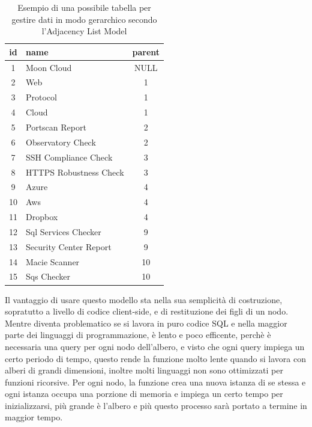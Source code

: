 \begin{table}[ht!]
\centering
\begin{tabular}[c]{| c | l | c |} 
	\hline
	id & name & parent \\ [0.5ex] 
	\hline
	\rowcolor{rootnodecell} 1 & Moon Cloud & NULL \\ [0.5ex] 
	\rowcolor{categorycell} 2 & Web & 1 \\ [0.5ex] 
	\rowcolor{categorycell} 3 & Protocol & 1 \\ [0.5ex] 
	\rowcolor{categorycell} 4 & Cloud & 1 \\ [0.5ex] 
	\rowcolor{evaluationcell} 5 & Portscan Report & 2 \\ [0.5ex] 
	\rowcolor{evaluationcell} 6 & Observatory Check & 2 \\ [0.5ex] 
	\rowcolor{evaluationcell} 7 & SSH Compliance Check & 3 \\ [0.5ex] 
	\rowcolor{evaluationcell} 8 & HTTPS Robustness Check & 3 \\ [0.5ex] 
	\rowcolor{categorycell} 9 & Azure & 4 \\ [0.5ex] 
	\rowcolor{categorycell} 10 & Aws & 4 \\ [0.5ex] 
	\rowcolor{categorycell} 11 & Dropbox & 4 \\ [0.5ex] 
	\rowcolor{evaluationcell} 12 & Sql Services Checker & 9 \\ [0.5ex] 
	\rowcolor{evaluationcell} 13 & Security Center Report & 9 \\ [0.5ex] 
	\rowcolor{evaluationcell} 14 & Macie Scanner & 10 \\ [0.5ex] 
	\rowcolor{evaluationcell} 15 & Sqs Checker & 10 \\ [0.5ex]
	\hline
\end{tabular}
\caption{Esempio di una possibile tabella per gestire dati in modo gerarchico secondo l'Adjacency List Model}
\label{table:adjacency_list_model_table}
\end{table}

Il vantaggio di usare questo modello sta nella sua semplicità di costruzione, sopratutto a livello di codice client-side, 
e di restituzione dei figli di un nodo. Mentre diventa problematico se si lavora in puro codice SQL e nella maggior parte dei linguaggi 
di programmazione, è lento e poco efficente, perchè è necessaria una query per ogni nodo dell'albero, e visto che ogni query impiega 
un certo periodo di tempo, questo rende la funzione molto lente quando si lavora con alberi di grandi dimensioni, inoltre molti linguaggi 
non sono ottimizzati per funzioni ricorsive. Per ogni nodo, la funzione crea una nuova istanza di se stessa e ogni istanza occupa 
una porzione di memoria e impiega un certo tempo per inizializzarsi, più grande è l'albero e più questo processo sarà portato a termine 
in maggior tempo.

